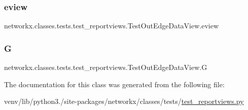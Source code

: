 \subsubsection{\texorpdfstring{eview}{eview}}
{\footnotesize\ttfamily networkx.\+classes.\+tests.\+test\+\_\+reportviews.\+Test\+Out\+Edge\+Data\+View.\+eview}

\mbox{\label{classnetworkx_1_1classes_1_1tests_1_1test__reportviews_1_1TestOutEdgeDataView_a9525468c9f97291275fe02ae3fd352d1}} 
\subsubsection{\texorpdfstring{G}{G}}
{\footnotesize\ttfamily networkx.\+classes.\+tests.\+test\+\_\+reportviews.\+Test\+Out\+Edge\+Data\+View.\+G}



The documentation for this class was generated from the following file\+:\begin{DoxyCompactItemize}
\item 
venv/lib/python3./site-\/packages/networkx/classes/tests/\hyperlink{test__reportviews_8py}{test\+\_\+reportviews.\+py}\end{DoxyCompactItemize}
